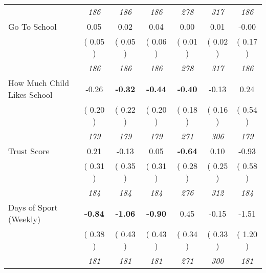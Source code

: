 \begin{tabular}{l c c c c c c}
& \textit{ 186 } & \textit{ 186 } & \textit{ 186 } & \textit{ 278 } & \textit{ 317 } & \textit{ 186 } \\
Go To School &      0.05 &      0.02 &      0.04 &      0.00 &      0.01 &     -0.00 \\
& (     0.05 ) & (     0.05 ) & (     0.06 ) & (     0.01 ) & (     0.02 ) & (     0.17 ) \\
& \textit{ 186 } & \textit{ 186 } & \textit{ 186 } & \textit{ 278 } & \textit{ 317 } & \textit{ 186 } \\
How Much Child Likes School &     -0.26 & \textbf{     -0.32 } & \textbf{     -0.44 } & \textbf{     -0.40 } &     -0.13 &      0.24 \\
& (     0.20 ) & (     0.22 ) & (     0.20 ) & (     0.18 ) & (     0.16 ) & (     0.54 ) \\
& \textit{ 179 } & \textit{ 179 } & \textit{ 179 } & \textit{ 271 } & \textit{ 306 } & \textit{ 179 } \\
Trust Score &      0.21 &     -0.13 &      0.05 & \textbf{     -0.64 } &      0.10 &     -0.93 \\
& (     0.31 ) & (     0.35 ) & (     0.31 ) & (     0.28 ) & (     0.25 ) & (     0.58 ) \\
& \textit{ 184 } & \textit{ 184 } & \textit{ 184 } & \textit{ 276 } & \textit{ 312 } & \textit{ 184 } \\
Days of Sport (Weekly) & \textbf{     -0.84 } & \textbf{     -1.06 } & \textbf{     -0.90 } &      0.45 &     -0.15 &     -1.51 \\
& (     0.38 ) & (     0.43 ) & (     0.43 ) & (     0.34 ) & (     0.33 ) & (     1.20 ) \\
& \textit{ 181 } & \textit{ 181 } & \textit{ 181 } & \textit{ 271 } & \textit{ 300 } & \textit{ 181 } \\
\bottomrule
\end{tabular}
